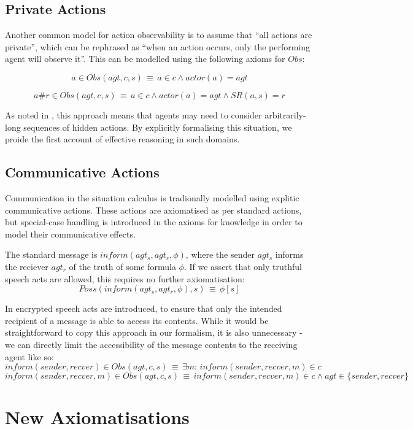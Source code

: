\subsection{Private Actions}

Another common model for action observability is to assume that {}``all
actions are private'', which can be rephrased as {}``when an action
occurs, only the performing agent will observe it''. This can be
modelled using the following axioms for $Obs$:

\[
a\in Obs(agt,c,s)\,\equiv\, a\in c\wedge actor(a)=agt\]


\[
a\#r\in Obs(agt,c,s)\,\equiv\, a\in c\wedge actor(a)=agt\wedge SR(a,s)=r\]


As noted in \citep{Lesperance99sitcalc_approach}, this approach means
that agents may need to consider arbitrarily-long sequences of hidden
actions. By explicitly formalising this situation, we proide the first
account of effective reasoning in such domains.


\subsection{Communicative Actions}

Communication in the situation calculus is tradionally modelled using
explitic communicative actions. These actions are axiomatised as per
standard actions, but special-case handling is introduced in the axioms
for knowledge in order to model their communicative effects.

The standard message is $inform(agt_{s},agt_{r},\phi)$, where the
sender $agt_{s}$ informs the reciever $agt_{r}$ of the truth of
some formula $\phi$. If we assert that only truthful speech acts
are allowed, this requires no further axiomatisation:\[
Poss(inform(agt_{s},agt_{r},\phi),s)\,\equiv\,\phi[s]\]


In \citep{shapiro01casl_feat_inter} encrypted speech acts are introduced,
to ensure that only the intended recipient of a message is able to
access its contents. While it would be straightforward to copy this
approach in our formalism, it is also unnecessary - we can directly
limit the accessibility of the message contents to the receiving agent
like so:\[
inform(sender,recver)\in Obs(agt,c,s)\,\equiv\,\exists m:\, inform(sender,recver,m)\in c\]
\[
inform(sender,recver,m)\in Obs(agt,c,s)\,\equiv\, inform(sender,recver,m)\in c\wedge agt\in\{sender,recver\}\]



\section{New Axiomatisations}

